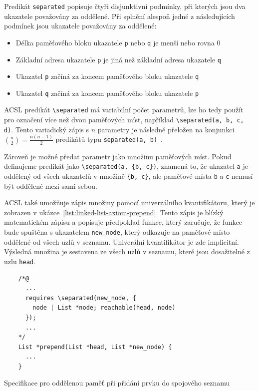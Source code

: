 Predikát \texttt{separated} popisuje čtyři disjunktivní podmínky,
při kterých jsou dva ukazatele považovány za oddělené.
Při splnění alespoň jedné z následujících podmínek
jsou ukazatele považovány za oddělené:

\begin{itemize}
    \item Délka paměťového bloku ukazatele \texttt{p} nebo \texttt{q} je menší nebo rovna 0
    \item Základní adresa ukazatele \texttt{p} je jiná než základní adresa ukazatele \texttt{q}
    \item Ukazatel \texttt{p} začíná za koncem paměťového bloku ukazatele \texttt{q}
    \item Ukazatel \texttt{q} začíná za koncem paměťového bloku ukazatele \texttt{p}
\end{itemize}

ACSL predikát \texttt{\textbackslash separated} má variabilní počet parametrů,
lze ho tedy použít pro označení více než dvou paměťových míst, například
\texttt{\textbackslash separated(a, b, c, d)}.
Tento variadický zápis s $n$ parametry
je následně přeložen na konjunkci $\binom{n}{2} = \frac{n(n-1)}{2}$ predikátů typu \texttt{separated(a, b)}~\cite{Correnson2018Separated}.

Zároveň je možné předat parametr jako množinu paměťových míst.
Pokud definujeme predikát jako \texttt{\textbackslash separated(a, \{b, c\})},
znamená to, že ukazatel \texttt{a} je oddělený od všech ukazatelů v množině \texttt{\{b, c\}},
ale paměťové místa \texttt{b} a \texttt{c} nemusí být oddělené mezi sami sebou.

ACSL také umožňuje zápis množiny pomocí univerzálního kvantifikátoru,
který je zobrazen v ukázce~\ref{list:linked-list-axiom-prepend}.
Tento zápis je blízký matematickém zápisu a popisuje předpoklad funkce,
který zaručuje, že funkce bude spuštěna s ukazatelem \texttt{new\_node},
který odkazuje na paměťové místo oddělené od všech uzlů v seznamu.
Univerální kvantifikátor je zde implicitní.
Výsledná množina je sestavena ze všech uzlů v seznamu,
které jsou dosažitelné z uzlu \texttt{head}.

\begin{listing}[H]
    \begin{verbatim}
    /*@
      ...
      requires \separated(new_node, {
        node | List *node; reachable(head, node)
      });
      ...
    */
    List *prepend(List *head, List *new_node) {
      ...
    }
    \end{verbatim}
    \caption{Specifikace pro oddělenou paměť při přidání prvku do spojového seznamu}
    \label{list:linked-list-axiom-prepend}
\end{listing}


